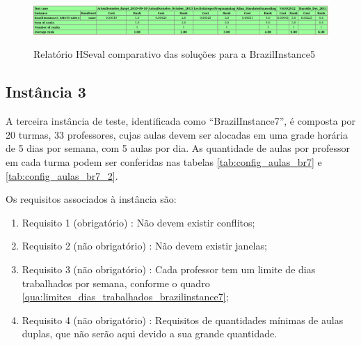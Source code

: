\begin{figure}[h]
	\centering
	\caption{Relatório HSeval comparativo das soluções para a BrazilInstance5}
	\includegraphics[width=1\textwidth]{./dados/figuras/benchmark_instance5}
	\label{fig:rankin_brazilinstance5}
\end{figure}

\clearpage
\subsection{Instância 3}

A terceira instância de teste, identificada como ``BrazilInstance7'', é composta por 20 turmas, 33 professores, cujas aulas devem ser alocadas em uma grade horária de 5 dias por semana, com 5 aulas por dia. As quantidade de aulas por professor em cada turma podem ser conferidas nas tabelas \ref{tab:config_aulas_br7} e \ref{tab:config_aulas_br7_2}.



\newpage
Os requisitos associados à instância são:
\begin{enumerate}
	\item Requisito 1 (obrigatório) : Não devem existir conflitos;
	\item Requisito 2 (não obrigatório) : Não devem existir janelas;
	\item Requisito 3 (não obrigatório) : Cada professor tem um limite de dias trabalhados por semana, conforme o quadro \ref{qua:limites_dias_trabalhados_brazilinstance7};
	\item Requisito 4 (não obrigatório) : Requisitos de quantidades mínimas de aulas duplas, que não serão aqui  devido a sua grande quantidade.
\end{enumerate}

